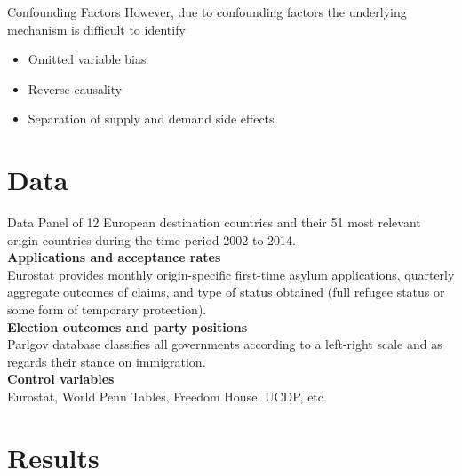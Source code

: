\documentclass{beamer}
\begin{document}
	\begin{frame}{Confounding Factors}
\vspace{.4cm}
However, due to confounding factors the underlying mechanism is difficult to identify
\vspace{.2cm}
\begin{itemize}
\item Omitted variable bias 
\item Reverse causality
\item Separation of supply and demand side effects
\end{itemize}
	\end{frame}
	
	
\section{Data}
	\begin{frame}{Data}
Panel of 12 European destination countries and their 51 most relevant origin countries during the time period 2002
to 2014.\\\vspace{.4cm}	
\textbf{Applications and acceptance rates}\\\vspace{.2cm}
Eurostat provides monthly origin-specific first-time asylum applications, quarterly aggregate outcomes of claims, and type of status obtained
(full refugee status or some form of temporary protection).\\\vspace{.4cm}
\textbf{Election outcomes and party positions}\\\vspace{.2cm}
Parlgov database classifies all governments according to a left-right scale and as regards their stance on immigration.\\\vspace{.4cm}
\textbf{Control variables}\\\vspace{.2cm}
Eurostat, World Penn Tables, Freedom House, UCDP, etc.
	\end{frame}

\section{Results}
\end{document}
